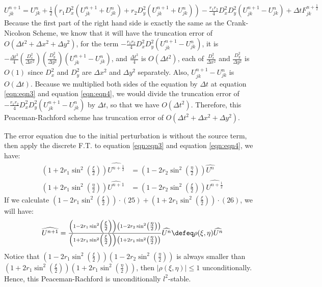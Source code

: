 \begin{answer}
    \begin{equation}
        U_{jk}^{n+1} = U_{jk}^n + \tfrac{1}{2}\left(r_1D_x^2(U_{jk}^{n+1} + U_{jk}^n) + r_2D_y^2(U_{jk}^{n+1}+U_{jk}^n)\right) - \tfrac{r_1r_2}{4}D_x^2D_y^2(U_{jk}^{n+1}-U_{jk}^{n})+ \Delta t F_{jk}^{n + \frac{1}{2}}
    \end{equation}
    Because the first part of the right hand side is exactly the same as the Crank-Nicolson Scheme, we know that it will have the truncation error of $O(\Delta t^2 + \Delta x^2 + \Delta y ^2)$, for the term $- \tfrac{r_1r_2}{4}D_x^2D_y^2(U_{jk}^{n+1}-U_{jk}^{n})$, it is $-\tfrac{\Delta t^2}{4}(\tfrac{D_x^2}{\Delta x^2})(\tfrac{D_y^2}{\Delta y^2})(U_{jk}^{n+1}-U_{jk}^n)$, and  $\tfrac{\Delta t^2}{4}$ is $O(\Delta t^2)$, each of $\tfrac{D_x^2}{\Delta x^2}$ and $\tfrac{D_y^2}{\Delta y^2}$ is $O(1)$ since $D_x^2$ and $D_y^2$ are $\Delta x^2$ and $\Delta y^2$ separately. Also, $U_{jk}^{n+1}-U_{jk}^n$ is $O(\Delta t)$. Because we multiplied both sides of the equation by $\Delta t$ at equation \ref{eqn:eqn3} and equation \ref{eqn:eqn4}, we would divide the truncation error of $- \tfrac{r_1r_2}{4}D_x^2D_y^2(U_{jk}^{n+1}-U_{jk}^{n})$ by $\Delta t$, so that we have $O(\Delta t^2)$. Therefore, this Peaceman-Rachford scheme has truncation error of $O(\Delta t^2 + \Delta x^2 + \Delta y^2)$.
    
    The error equation due to the initial perturbation is without the source term, then apply the discrete F.T. to equation \ref{eqn:eqn3} and equation \ref{eqn:eqn4}, we have:
    \begin{align}
        \left(1+2r_1\sin^2\left(\tfrac{\xi}{2}\right)\right)\widehat{U^{n+\frac{1}{2}}} &= \left(1 - 2r_2\sin^2\left(\tfrac{\eta}{2}\right)\right)\widehat{U^n}\\
        \left(1+2r_1\sin^2\left(\tfrac{\eta}{2}\right)\right)\widehat{U^{n+1}} &= \left(1 - 2r_2\sin^2\left(\tfrac{\xi}{2}\right)\right)\widehat{U^{n+\tfrac{1}{2}}}
    \end{align}
    If we calculate $\left(1-2r_1\sin^2\left(\tfrac{\xi}{2}\right)\right)\cdot(25)+\left(1+2r_1\sin^2\left(\tfrac{\xi}{2}\right)\right)\cdot(26)$, we will have:
    \begin{equation}
        \widehat{U^{n+1}} = \tfrac{\left(1-2r_1\sin^2\left(\tfrac{\xi}{2}\right)\right)\left(1 - 2r_2\sin^2\left(\tfrac{\eta}{2}\right)\right)}{\left(1+2r_1\sin^2\left(\tfrac{\xi}{2}\right)\right)\left(1+2r_1\sin^2\left(\tfrac{\eta}{2}\right)\right)}\widehat{U^n} \defeq \rho(\xi,\eta)\widehat{U^n}
    \end{equation}
    Notice that $\left(1-2r_1\sin^2\left(\tfrac{\xi}{2}\right)\right)\left(1 - 2r_2\sin^2\left(\tfrac{\eta}{2}\right)\right)$ is always smaller than $\left(1+2r_1\sin^2\left(\tfrac{\xi}{2}\right)\right)\left(1+2r_1\sin^2\left(\tfrac{\eta}{2}\right)\right)$, then $\lvert \rho(\xi,\eta) \rvert \leq 1$ unconditionally. Hence, this Peaceman-Rachford is unconditionally $l^2$-stable.
\end{answer}